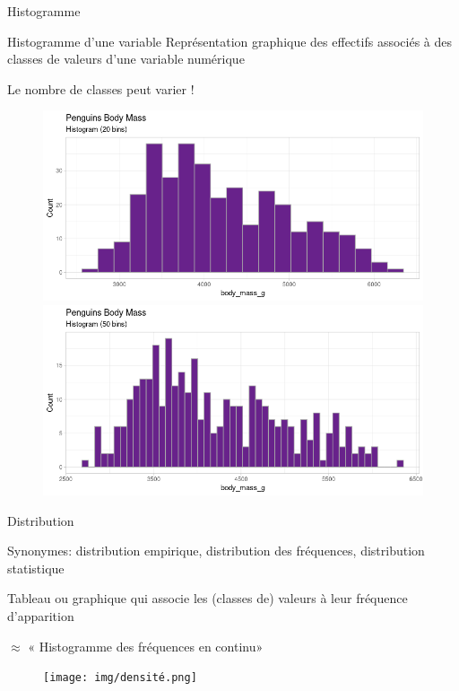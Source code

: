 \documentclass{beamer}
\begin{document}
\begin{frame}{Histogramme}

 \begin{block}{Histogramme d'une variable}
Représentation graphique des \alert{effectifs} associés à des \alert{classes de valeurs} d'une variable numérique 
\end{block}

Le nombre de classes peut varier ! 


\begin{figure}[!htb]
   \begin{minipage}{0.5\textwidth}
     \centering
     \includegraphics[width=.9\linewidth]{img/histogramme1.png}
     
   \end{minipage}\hfill
   \begin{minipage}{0.5\textwidth}
     \centering
     \includegraphics[width=.9\linewidth]{img/histogramme2.png}
     
   \end{minipage}
\end{figure}




\end{frame}


\begin{frame}{Distribution}

\begin{tiny}
  Synonymes: distribution empirique, distribution des fréquences, distribution statistique
\end{tiny}

\alert{Tableau} ou \alert{graphique} qui associe les (classes de) valeurs à leur \alert{fréquence d'apparition}


$\approx$ « Histogramme des fréquences en continu»


\begin{figure}
  \centering
     \texttt{[image: img/densité.png]}
\end{figure}
\end{frame}
\end{document}
